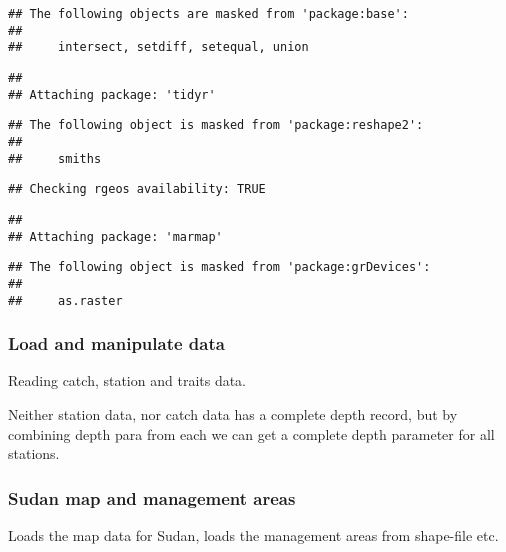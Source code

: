 \documentclass[]{article}
\begin{document}
\begin{verbatim}
## The following objects are masked from 'package:base':
## 
##     intersect, setdiff, setequal, union
\end{verbatim}

\begin{verbatim}
## 
## Attaching package: 'tidyr'
\end{verbatim}

\begin{verbatim}
## The following object is masked from 'package:reshape2':
## 
##     smiths
\end{verbatim}

\begin{verbatim}
## Checking rgeos availability: TRUE
\end{verbatim}

\begin{verbatim}
## 
## Attaching package: 'marmap'
\end{verbatim}

\begin{verbatim}
## The following object is masked from 'package:grDevices':
## 
##     as.raster
\end{verbatim}

\subsubsection{Load and manipulate data}\label{load-and-manipulate-data}

Reading catch, station and traits data.

Neither station data, nor catch data has a complete depth record, but by
combining depth para from each we can get a complete depth parameter for
all stations.

\subsubsection{Sudan map and management
areas}\label{sudan-map-and-management-areas}

Loads the map data for Sudan, loads the management areas from shape-file
etc.
\end{document}
